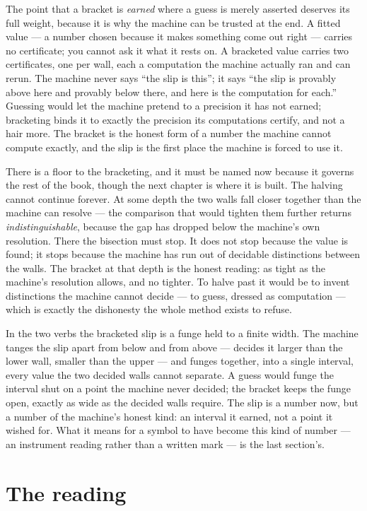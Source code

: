 The point that a bracket is \emph{earned} where a guess is merely asserted deserves its full weight, because it is why
the machine can be trusted at the end. A fitted value --- a number chosen because it makes something come out right ---
carries no certificate; you cannot ask it what it rests on. A bracketed value carries two certificates, one per wall,
each a computation the machine actually ran and can rerun. The machine never says ``the slip is this''; it says ``the
slip is provably above here and provably below there, and here is the computation for each.'' Guessing would let the
machine pretend to a precision it has not earned; bracketing binds it to exactly the precision its computations
certify, and not a hair more. The bracket is the honest form of a number the machine cannot compute exactly, and the
slip is the first place the machine is forced to use it.

There is a floor to the bracketing, and it must be named now because it governs the rest of the book, though the next
chapter is where it is built. The halving cannot continue forever. At some depth the two walls fall closer together than
the machine can resolve --- the comparison that would tighten them further returns \emph{indistinguishable}, because the
gap has dropped below the machine's own resolution. There the bisection must stop. It does not stop because the value is
found; it stops because the machine has run out of decidable distinctions between the walls. The bracket at that depth
is the honest reading: as tight as the machine's resolution allows, and no tighter. To halve past it would be to invent
distinctions the machine cannot decide --- to guess, dressed as computation --- which is exactly the dishonesty the
whole method exists to refuse.

In the two verbs the bracketed slip is a funge held to a finite width. The machine tanges the slip apart from below and
from above --- decides it larger than the lower wall, smaller than the upper --- and funges together, into a single
interval, every value the two decided walls cannot separate. A guess would funge the interval shut on a point the
machine never decided; the bracket keeps the funge open, exactly as wide as the decided walls require. The slip is a
number now, but a number of the machine's honest kind: an interval it earned, not a point it wished for. What it means
for a symbol to have become this kind of number --- an instrument reading rather than a written mark --- is the last
section's.

\section{The reading}

